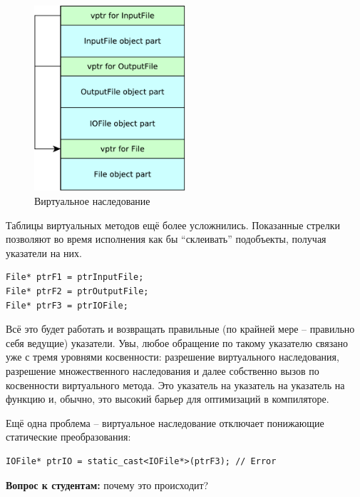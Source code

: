 \documentclass[a4paper,12pt,oneside]{article}
\newif\ifanswers
\begin{document}
\begin{figure}[h!]
\centering
\includegraphics[width=0.5\textwidth]{illustrations/virtualinh-crop.pdf}
\caption{Виртуальное наследование}
\label{fig:virtualinh-crop}
\end{figure}

Таблицы виртуальных методов ещё более усложнились. Показанные стрелки позволяют во время исполнения как бы ``склеивать'' подобъекты, получая указатели на них.

\begin{lstlisting}
File* ptrF1 = ptrInputFile;
File* ptrF2 = ptrOutputFile;
File* ptrF3 = ptrIOFile;
\end{lstlisting}

Всё это будет работать и возвращать правильные (по крайней мере -- правильно себя ведущие) указатели. Увы, любое обращение по такому указателю связано уже с тремя уровнями косвенности: разрешение виртуального наследования, разрешение множественного наследования и далее собственно вызов по косвенности виртуального метода. Это указатель на указатель на указатель на функцию и, обычно, это высокий барьер для оптимизаций в компиляторе.

Ещё одна проблема -- виртуальное наследование отключает понижающие статические преобразования:

\begin{lstlisting}
IOFile* ptrIO = static_cast<IOFile*>(ptrF3); // Error
\end{lstlisting}

\textbf{Вопрос к студентам:} почему это происходит?

\ifanswers
Правильный ответ: потому что для реконструкции объекта с виртуальным наследованием, компилятор должен пройти по каждой из возможных цепочек виртуального наследования и создать каждый из подобъектов. Это неконстантный оверхед по времени и памяти и разработчики языка не стали его закладывать в обычное преобразование.
\fi
\end{document}
